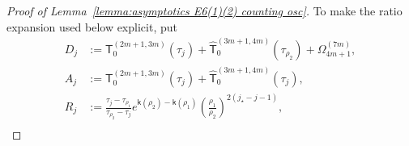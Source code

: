 \documentclass[a4paper]{article}
\numberwithin{equation}{section}
\begin{document}
\begin{proof}[Proof of Lemma~\ref{lemma:asymptotics E6(1)(2) counting osc}]

To make the ratio expansion used below explicit, put
\begin{align*}
D_j&:=\mathsf T_0^{(2m+1,3m)}(\tau_j)
+\widehat{\mathsf T}_0^{(3m+1,4m)}(\tau_{\rho_2})
+\Omega_{4m+1}^{(7m)},\\
A_j&:=\mathsf T_0^{(2m+1,3m)}(\tau_j)
+\widehat{\mathsf T}_0^{(3m+1,4m)}(\tau_j),\\
R_j&:=\frac{\tau_j-\tau_{\rho_1}}{\tau_{\rho_2}-\tau_j}
e^{\mathsf k(\rho_2)-\mathsf k(\rho_1)}
\left(\frac{\rho_1}{\rho_2}\right)^{2(j_\star-j-1)},\\

\end{align*}
\end{proof}
\end{document}
